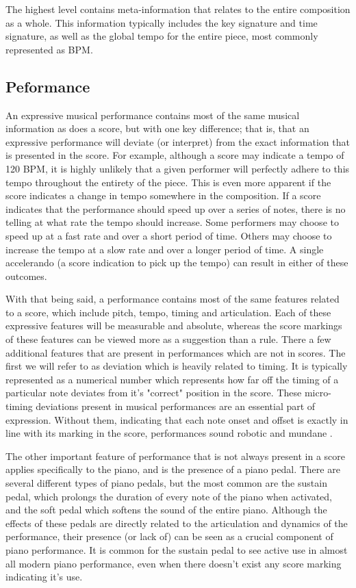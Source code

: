 The highest level contains meta-information that relates to the entire composition as a whole. This information typically includes the key signature and time signature, as well as the global tempo for the entire piece, most commonly represented as BPM. 

\subsection{Peformance}
An expressive musical performance contains most of the same musical information as does a score, but with one key difference; that is, that an expressive performance will deviate (or interpret) from the exact information that is presented in the score. For example, although a score may indicate a tempo of 120 BPM, it is highly unlikely that a given performer will perfectly adhere to this tempo throughout the entirety of the piece. This is even more apparent if the score indicates a change in tempo somewhere in the composition. If a score indicates that the performance should speed up over a series of notes, there is no telling at what rate the tempo should increase. Some performers may choose to speed up at a fast rate and over a short period of time. Others may choose to increase the tempo at a slow rate and over a longer period of time. A single accelerando (a score indication to pick up the tempo) can result in either of these outcomes. 

With that being said, a performance contains most of the same features related to a score, which include pitch, tempo, timing and articulation. Each of these expressive features will be measurable and absolute, whereas the score markings of these features can be viewed more as a suggestion than a rule. There a few additional features that are present in performances which are not in scores. The first we will refer to as deviation which is heavily related to timing. It is typically represented as a numerical number which represents how far off the timing of a particular note deviates from it's "correct" position in the score. These micro-timing deviations present in musical performances are an essential part of expression. Without them, indicating that each note onset and offset is exactly in line with its marking in the score, performances sound robotic and mundane . 

The other important feature of performance that is not always present in a score applies specifically to the piano, and is the presence of a piano pedal. There are several different types of piano pedals, but the most common are the sustain pedal, which prolongs the duration of every note of the piano when activated, and the soft pedal which softens the sound of the entire piano. Although the effects of these pedals are directly related to the articulation and dynamics of the performance, their presence (or lack of) can be seen as a crucial component of piano performance. It is common for the sustain pedal to see active use in almost all modern piano performance, even when there doesn't exist any score marking indicating it's use. 

